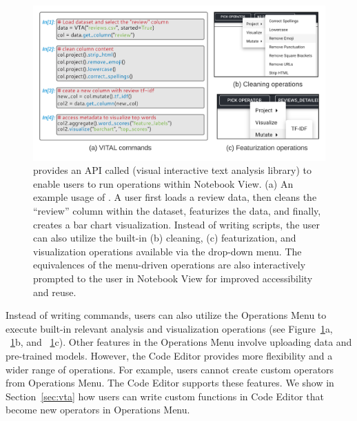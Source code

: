 \begin{figure}[!htb] 
  \centering
  \includegraphics[width=\linewidth]{figures/vital.pdf}
  \caption{\small \system provides an API called \vital (visual interactive text analysis library) to enable users to run \vta operations within Notebook View. (a) An example usage of \vital. A user first loads a review data, then cleans the ``review'' column within the dataset, featurizes the data, and finally, creates a bar chart visualization. Instead of writing scripts, the user can also utilize the built-in (b) cleaning, (c) featurization, and visualization operations available via the drop-down menu. The \vital equivalences of the menu-driven operations are also interactively prompted to the user in Notebook View for improved accessibility and reuse. \label{fig:workflow}} 
\end{figure}

Instead of writing \vital commands, users can also utilize the Operations Menu to execute built-in relevant analysis and visualization operations (see Figure~\ref{fig:workflow}a, ~\ref{fig:workflow}b, and ~\ref{fig:workflow}c). Other features in the Operations Menu involve uploading data and pre-trained models. However, the Code Editor provides more flexibility and a wider range of operations. For example, users cannot create custom operators from Operations Menu. The Code Editor supports these features. We show in Section~\ref{sec:vta} how users can write custom functions in Code Editor that become new operators in Operations Menu. 



